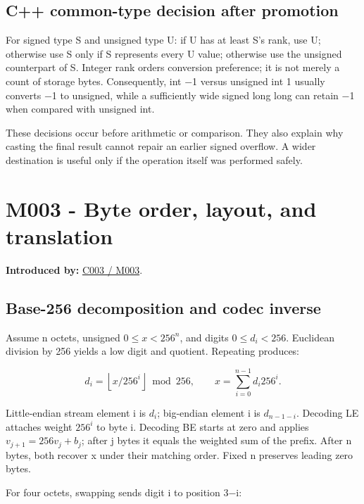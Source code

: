 \subsection{C++ common-type decision after promotion}\label{01-foundations-i-ch011-c-common-type-decision-after-promotion}

For signed type S and unsigned type U: if U has at least S's rank, use U; otherwise use S only if S represents every U value; otherwise use the unsigned counterpart of S. Integer rank orders conversion preference; it is not merely a count of storage bytes. Consequently, int −1 versus unsigned int 1 usually converts −1 to unsigned, while a sufficiently wide signed long long can retain −1 when compared with unsigned int.

These decisions occur before arithmetic or comparison. They also explain why casting the final result cannot repair an earlier signed overflow. A wider destination is useful only if the operation itself was performed safely.

\section{M003 - Byte order, layout, and translation}\label{01-foundations-i-ch011-m003---byte-order-layout-and-translation}

\textbf{Introduced by:} \hyperref[01-foundations-i-ch002-where-the-bytes-live]{C003 / M003}.

\subsection{Base-256 decomposition and codec inverse}\label{01-foundations-i-ch011-base-256-decomposition-and-codec-inverse}

Assume n octets, unsigned \(0\le x<256^n\), and digits \(0\le d_i<256\). Euclidean division by 256 yields a low digit and quotient. Repeating produces:

\[
d_i=\left\lfloor x/256^i\right\rfloor\bmod256,\qquad
x=\sum_{i=0}^{n-1}d_i256^i.
\]

Little-endian stream element i is \(d_i\); big-endian element i is \(d_{n-1-i}\). Decoding LE attaches weight \(256^i\) to byte i. Decoding BE starts at zero and applies \(v_{j+1}=256v_j+b_j\); after j bytes it equals the weighted sum of the prefix. After n bytes, both recover x under their matching order. Fixed n preserves leading zero bytes.

For four octets, swapping sends digit i to position 3−i:

